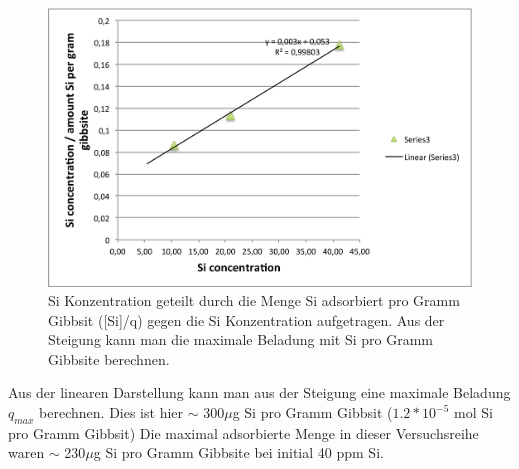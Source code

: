 \documentclass[preprint,review,12pt]{elsarticle}
\begin{document}
\begin{figure}[h!]
\begin{center}
\includegraphics[width=0.7\columnwidth]{figures/langmuir_fig_lin/langmuir_fig_lin.png}
\caption{Si Konzentration geteilt durch die Menge Si adsorbiert pro Gramm Gibbsit ([Si]/q) gegen die Si Konzentration aufgetragen. Aus der Steigung kann man die maximale Beladung mit Si pro Gramm Gibbsite berechnen. }
\end{center}
\end{figure}

Aus der linearen Darstellung kann man aus der Steigung  eine maximale Beladung $q_{max}$ berechnen.
Dies ist hier $\sim$ 300$\mu$g Si pro Gramm Gibbsit ($1.2*10^{-5}$ mol Si pro Gramm Gibbsit)
Die maximal adsorbierte Menge in dieser Versuchsreihe waren  $\sim$ 230$\mu$g Si pro Gramm Gibbsite bei initial 40 ppm Si.
\end{document}
